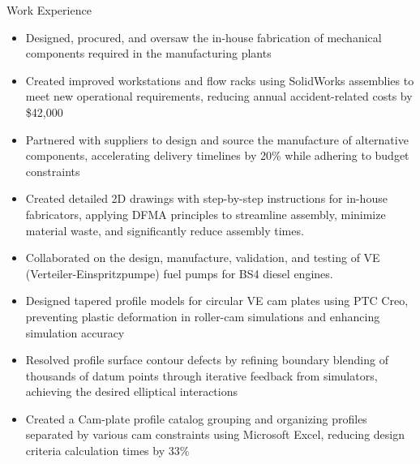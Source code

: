 \documentclass{resume}
\begin{document}
\begin{experienceSection}{Work Experience} %
    \experienceItem[
        company={Toyota Motors}, %
        location={Bidadi, India}, %
        position={Mechanical Design Intern}, %
        duration={June 2024 – August 2024} %
    ]
    \begin{itemize}
        \itemsep -6pt {}
        \item Designed, procured, and oversaw the in-house fabrication of mechanical components required in the manufacturing plants %
        \item Created improved workstations and flow racks using SolidWorks assemblies to meet new operational requirements, reducing annual accident-related costs by \$42,000 %
        \item Partnered with suppliers to design and source the manufacture of alternative components, accelerating delivery timelines by 20\% while adhering to budget constraints %
        \item Created detailed 2D drawings with step-by-step instructions for in-house fabricators, applying DFMA principles to streamline assembly, minimize material waste, and significantly reduce assembly times. %
    \end{itemize}

    \experienceItem[
        company={BOSCH}, %
        location={Bangalore, India}, %
        position={Mechanical Design Intern}, %
        duration={June 2023 – August 2023} %
    ]
    \begin{itemize}
        \itemsep -6pt {}
        \item Collaborated on the design, manufacture, validation, and testing of VE (Verteiler-Einspritzpumpe) fuel pumps for BS4 diesel engines. %
        \item Designed tapered profile models for circular VE cam plates using PTC Creo, preventing plastic deformation in roller-cam simulations and enhancing simulation accuracy %
        \item Resolved profile surface contour defects by refining boundary blending of thousands of datum points through iterative feedback from simulators, achieving the desired elliptical interactions %
        \item Created a Cam-plate profile catalog grouping and organizing profiles separated by various cam constraints using Microsoft Excel, reducing design criteria calculation times by 33\% %
    \end{itemize}

\end{experienceSection}
\end{document}
